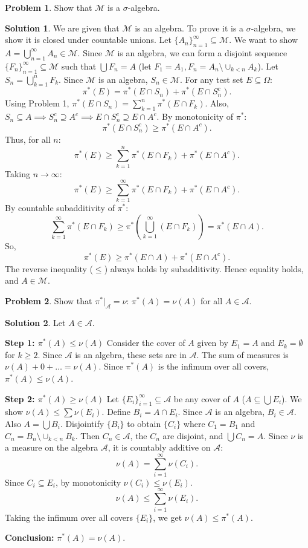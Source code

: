 \documentclass{article}
\theoremstyle{definition}
\newtheorem{problem}{Problem}
\newtheorem*{solution}{Solution}
\newcommand{\M}{\mathcal{M}}
\newcommand{\A}{\mathcal{A}}
\newcommand{\pistar}{\pi^*}
\begin{document}
\hrulefill

\begin{problem}
Show that $\M$ is a $\sigma$-algebra.
\end{problem}

\begin{solution}
We are given that $\M$ is an algebra. To prove it is a $\sigma$-algebra, we show it is closed under countable unions. Let $\{A_n\}_{n=1}^\infty \subseteq \M$. We want to show $A = \bigcup_{n=1}^\infty A_n \in \M$.
Since $\M$ is an algebra, we can form a disjoint sequence $\{F_n\}_{n=1}^\infty \subseteq \M$ such that $\bigcup F_n = A$ (let $F_1 = A_1, F_n = A_n \setminus \cup_{k<n} A_k$).
Let $S_n = \bigcup_{k=1}^n F_k$. Since $\M$ is an algebra, $S_n \in \M$.
For any test set $E \subseteq \Omega$:
\[ \pistar(E) = \pistar(E \cap S_n) + \pistar(E \cap S_n^c). \]
Using Problem 1, $\pistar(E \cap S_n) = \sum_{k=1}^n \pistar(E \cap F_k)$.
Also, $S_n \subseteq A \implies S_n^c \supseteq A^c \implies E \cap S_n^c \supseteq E \cap A^c$. By monotonicity of $\pistar$:
\[ \pistar(E \cap S_n^c) \ge \pistar(E \cap A^c). \]
Thus, for all $n$:
\[ \pistar(E) \ge \sum_{k=1}^n \pistar(E \cap F_k) + \pistar(E \cap A^c). \]
Taking $n \to \infty$:
\[ \pistar(E) \ge \sum_{k=1}^\infty \pistar(E \cap F_k) + \pistar(E \cap A^c). \]
By countable subadditivity of $\pistar$:
\[ \sum_{k=1}^\infty \pistar(E \cap F_k) \ge \pistar\left(\bigcup_{k=1}^\infty (E \cap F_k)\right) = \pistar(E \cap A). \]
So,
\[ \pistar(E) \ge \pistar(E \cap A) + \pistar(E \cap A^c). \]
The reverse inequality ($\le$) always holds by subadditivity. Hence equality holds, and $A \in \M$.
\end{solution}

\hrulefill

\begin{problem}
Show that $\pistar|_{\A} = \nu$: $\pistar(A) = \nu(A)$ for all $A \in \A$.
\end{problem}

\begin{solution}
Let $A \in \A$.

\textbf{Step 1: $\pistar(A) \le \nu(A)$}
Consider the cover of $A$ given by $E_1 = A$ and $E_k = \emptyset$ for $k \ge 2$. Since $\A$ is an algebra, these sets are in $\A$.
The sum of measures is $\nu(A) + 0 + \dots = \nu(A)$.
Since $\pistar(A)$ is the infimum over all covers, $\pistar(A) \le \nu(A)$.

\textbf{Step 2: $\pistar(A) \ge \nu(A)$}
Let $\{E_i\}_{i=1}^\infty \subseteq \A$ be any cover of $A$ ($A \subseteq \bigcup E_i$). We show $\nu(A) \le \sum \nu(E_i)$.
Define $B_i = A \cap E_i$. Since $\A$ is an algebra, $B_i \in \A$. Also $A = \bigcup B_i$.
Disjointify $\{B_i\}$ to obtain $\{C_i\}$ where $C_1 = B_1$ and $C_n = B_n \setminus \cup_{k<n} B_k$.
Then $C_n \in \A$, the $C_n$ are disjoint, and $\bigcup C_n = A$.
Since $\nu$ is a measure on the algebra $\A$, it is countably additive on $\A$:
\[ \nu(A) = \sum_{i=1}^\infty \nu(C_i). \]
Since $C_i \subseteq E_i$, by monotonicity $\nu(C_i) \le \nu(E_i)$.
\[ \nu(A) \le \sum_{i=1}^\infty \nu(E_i). \]
Taking the infimum over all covers $\{E_i\}$, we get $\nu(A) \le \pistar(A)$.

\textbf{Conclusion:} $\pistar(A) = \nu(A)$.
\end{solution}
\end{document}
